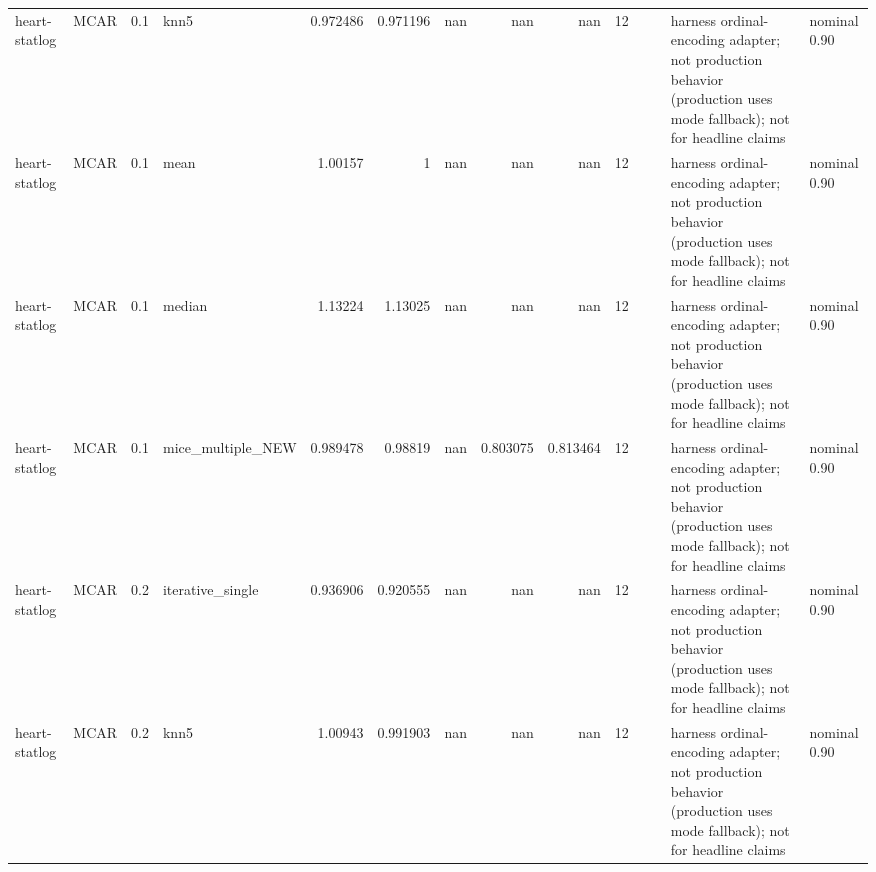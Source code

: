 \begin{table}[ht]
\begin{tabular}{llrlrrrrrrllll}
 heart-statlog        & MCAR        &         0.1 & knn5              &       0.972486 &             0.971196 &               nan        &                     nan        &                       nan        &        12 &                    &                                         & harness ordinal-encoding adapter; not production behavior (production uses mode fallback); not for headline claims & nominal 0.90              \\
 heart-statlog        & MCAR        &         0.1 & mean              &       1.00157  &             1        &               nan        &                     nan        &                       nan        &        12 &                    &                                         & harness ordinal-encoding adapter; not production behavior (production uses mode fallback); not for headline claims & nominal 0.90              \\
 heart-statlog        & MCAR        &         0.1 & median            &       1.13224  &             1.13025  &               nan        &                     nan        &                       nan        &        12 &                    &                                         & harness ordinal-encoding adapter; not production behavior (production uses mode fallback); not for headline claims & nominal 0.90              \\
 heart-statlog        & MCAR        &         0.1 & mice\_multiple\_NEW &       0.989478 &             0.98819  &               nan        &                       0.803075 &                         0.813464 &        12 &                    &                                         & harness ordinal-encoding adapter; not production behavior (production uses mode fallback); not for headline claims & nominal 0.90              \\
 heart-statlog        & MCAR        &         0.2 & iterative\_single  &       0.936906 &             0.920555 &               nan        &                     nan        &                       nan        &        12 &                    &                                         & harness ordinal-encoding adapter; not production behavior (production uses mode fallback); not for headline claims & nominal 0.90              \\
 heart-statlog        & MCAR        &         0.2 & knn5              &       1.00943  &             0.991903 &               nan        &                     nan        &                       nan        &        12 &                    &                                         & harness ordinal-encoding adapter; not production behavior (production uses mode fallback); not for headline claims & nominal 0.90              \\

\end{tabular}
\end{table}
